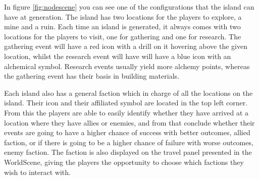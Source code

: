In figure \ref{fig:nodescene} you can see one of the configurations that the island can have at generation. The island has two locations for the players to explore, a mine and a ruin. 
Each time an island is generated, it always comes with two locations for the players to visit, one for gathering and one for research. The gathering event will have a red icon with a drill on it hovering above the given location, whilst the research event will have will have a blue icon with an alchemical symbol.
Research events usually yield more alchemy points, whereas the gathering event has their basis in building materials.

Each island also has a general faction which in charge of all the locations on the island. Their icon and their affiliated symbol are located in the top left corner. From this the players are able to easily identify whether they have arrived at a location where they have allies or enemies, and from that conclude whether their events are going to have a higher chance of success with better outcomes, allied faction, or if there is going to be a higher chance of failure with worse outcomes, enemy faction.
The faction is also displayed on the travel panel presented in the WorldScene, giving the players the opportunity to choose which factions they wish to interact with.

